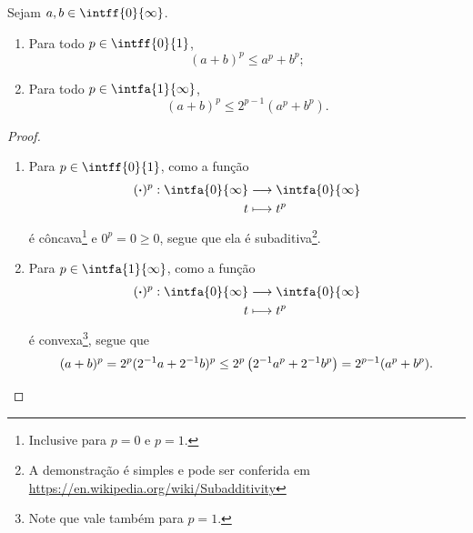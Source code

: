 \begin{prop}
\label{ana:prop.desig.pot.soma}
Sejam $a,b \in \intff{0}{\infty}$.
	\begin{enumerate}
	\item Para todo $p \in \intff{0}{1}$,
		\begin{equation*}
		(a+b)^p \leq a^p + b^p;
		\end{equation*}
	\item Para todo $p \in \intfa{1}{\infty}$,
		\begin{equation*}
		(a+b)^p \leq 2^{p-1}(a^p+b^p).
		\end{equation*}
	\end{enumerate}
\end{prop}
\begin{proof}
	\begin{enumerate}
	\item Para $p \in \intff{0}{1}$, como a função
		\begin{align*}
		\func{(\var)^p}{\intfa{0}{\infty}}{\intfa{0}{\infty}}{t}{t^p}
		\end{align*}
é côncava\footnote{Inclusive para $p=0$ e $p=1$.} e $0^p = 0 \geq 0$, segue que ela é subaditiva\footnote{A demonstração é simples e pode ser conferida em \url{https://en.wikipedia.org/wiki/Subadditivity}}.
	
	\item Para $p \in \intfa{1}{\infty}$, como a função
		\begin{align*}
		\func{(\var)^p}{\intfa{0}{\infty}}{\intfa{0}{\infty}}{t}{t^p}
		\end{align*}
é convexa\footnote{Note que vale também para $p=1$.}, segue que
		\begin{equation*}
		(a+b)^p = 2^p(2^{-1} a + 2^{-1} b)^p \leq 2^p \left( 2^{-1} a^p + 2^{-1} b^p \right) = 2^{p-1} (a^p + b^p).
		\end{equation*}
	\end{enumerate}
\end{proof}

